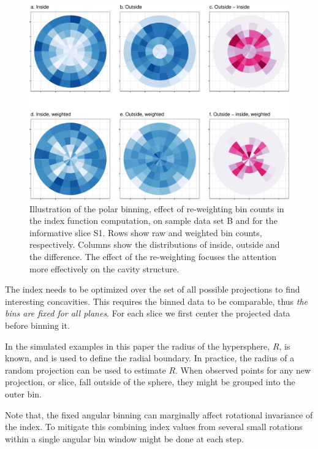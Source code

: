 \documentclass[]{interact}
\theoremstyle{plain}%
\theoremstyle{definition}
\theoremstyle{remark}
\begin{document}
\begin{figure}

{\centering \includegraphics[width=0.9\linewidth]{section_pursuit_files/figure-latex/data_and_densities-1} 

}

\caption{Illustration of the polar binning, effect of re-weighting bin counts in the index function computation, on sample data set B and for the informative slice S1. Rows show raw and weighted bin counts, respectively. Columns show the distributions of inside, outside and the difference. The effect of the re-weighting focuses the attention more effectively on the cavity structure.}\label{fig:data_and_densities}
\end{figure}

The index needs to be optimized over the set of all possible projections
to find interesting concavities. This requires the binned data to be
comparable, thus \emph{the bins are fixed for all planes}. For each
slice we first center the projected data before binning it.

In the simulated examples in this paper the radius of the hypersphere,
\(R\), is known, and is used to define the radial boundary. In practice,
the radius of a random projection can be used to estimate \(R\). When
observed points for any new projection, or slice, fall outside of the
sphere, they might be grouped into the outer bin.

Note that, the fixed angular binning can marginally affect rotational
invariance of the index. To mitigate this combining index values from
several small rotations within a single angular bin window might be done
at each step.
\end{document}
